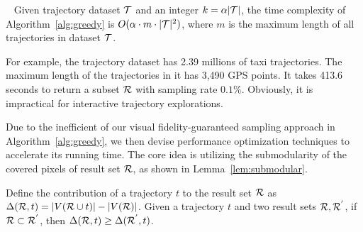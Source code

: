 \begin{lemma}~\label{lem:cost}
Given trajectory dataset $\mathcal{T}$ and an integer $k = \alpha |\mathcal{T}|$, the time complexity of Algorithm~\ref{alg:greedy} is $O(\alpha \cdot m \cdot |\mathcal{T}|^2)$, where $m$ is the maximum length of all trajectories in dataset $\mathcal{T}$.
\end{lemma}

For example, the \pt{} trajectory dataset has 2.39 millions of taxi trajectories.
The maximum length of the trajectories in it has 3,490 GPS points.
It takes 413.6 seconds to return a subset $\mathcal{R}$ with sampling rate $0.1\%$.
Obviously, it is impractical for interactive trajectory explorations.

Due to the inefficient of our visual fidelity-guaranteed sampling approach in Algorithm~\ref{alg:greedy},
we then devise performance optimization techniques to accelerate its running time.
The core idea is utilizing the submodularity of the covered pixels of result set $\mathcal{R}$, as shown in Lemma~\ref{lem:submodular}.

\begin{lemma}[Submodularity]\label{lem:submodular}
Define the contribution of a trajectory $t$ to the result set $\mathcal{R}$ as $\Delta(\mathcal{R}, t) = |V(\mathcal{R} \cup t)| - |V(\mathcal{R})|$.
Given a trajectory $t$ and two result sets $\mathcal{R},\mathcal{R}^{'}$, if $\mathcal{R} \subset \mathcal{R}^{'}$, then $ \Delta(\mathcal{R}, t) \geq \Delta(\mathcal{R}^{'}, t)$.
\end{lemma}


